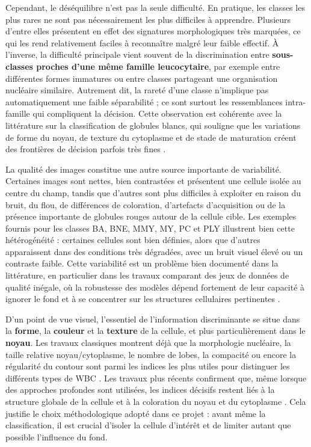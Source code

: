 \documentclass[journal,twocolumn]{IEEEtran}
\begin{document}
Cependant, le déséquilibre n’est pas la seule difficulté. En pratique, les classes les plus rares ne sont pas nécessairement les plus difficiles à apprendre. Plusieurs d’entre elles présentent en effet des signatures morphologiques très marquées, ce qui les rend relativement faciles à reconnaître malgré leur faible effectif. À l’inverse, la difficulté principale vient souvent de la discrimination entre \textbf{sous-classes proches d’une même famille leucocytaire}, par exemple entre différentes formes immatures ou entre classes partageant une organisation nucléaire similaire. Autrement dit, la rareté d’une classe n’implique pas automatiquement une faible séparabilité ; ce sont surtout les ressemblances intra-famille qui compliquent la décision. Cette observation est cohérente avec la littérature sur la classification de globules blancs, qui souligne que les variations de forme du noyau, de texture du cytoplasme et de stade de maturation créent des frontières de décision parfois très fines \cite{REZATOFIGHI2011333,a16110525}.

La qualité des images constitue une autre source importante de variabilité. Certaines images sont nettes, bien contrastées et présentent une cellule isolée au centre du champ, tandis que d’autres sont plus difficiles à exploiter en raison du bruit, du flou, de différences de coloration, d’artefacts d’acquisition ou de la présence importante de globules rouges autour de la cellule cible. Les exemples fournis pour les classes BA, BNE, MMY, MY, PC et PLY illustrent bien cette hétérogénéité : certaines cellules sont bien définies, alors que d’autres apparaissent dans des conditions très dégradées, avec un bruit visuel élevé ou un contraste faible. Cette variabilité est un problème bien documenté dans la littérature, en particulier dans les travaux comparant des jeux de données de qualité inégale, où la robustesse des modèles dépend fortement de leur capacité à ignorer le fond et à se concentrer sur les structures cellulaires pertinentes \cite{a16110525}.

D’un point de vue visuel, l’essentiel de l’information discriminante se situe dans la \textbf{forme}, la \textbf{couleur} et la \textbf{texture} de la cellule, et plus particulièrement dans le \textbf{noyau}. Les travaux classiques montrent déjà que la morphologie nucléaire, la taille relative noyau/cytoplasme, le nombre de lobes, la compacité ou encore la régularité du contour sont parmi les indices les plus utiles pour distinguer les différents types de WBC \cite{REZATOFIGHI2011333}. Les travaux plus récents confirment que, même lorsque des approches profondes sont utilisées, les indices décisifs restent liés à la structure globale de la cellule et à la coloration du noyau et du cytoplasme \cite{healthcare10112230,a16110525}. Cela justifie le choix méthodologique adopté dans ce projet : avant même la classification, il est crucial d’isoler la cellule d’intérêt et de limiter autant que possible l’influence du fond.
\end{document}
